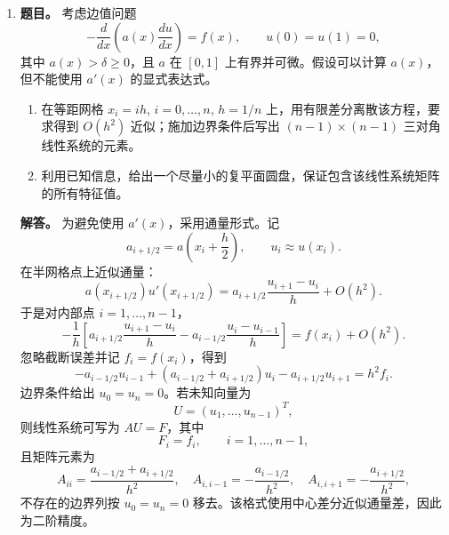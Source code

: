﻿\documentclass[UTF8,12pt]{ctexart}
\begin{document}
\begin{enumerate}[label=\textbf{\arabic*.},leftmargin=2.2em]
\textbf{解答。} 由 \(x=\cos\theta\)，
\[
T_{n+1}'(x)
=\frac{d}{dx}\cos((n+1)\theta)
=\frac{-(n+1)\sin((n+1)\theta)}{-\sin\theta},
\]
所以
\[
U_n(\cos\theta)=\frac{\sin((n+1)\theta)}{\sin\theta}.
\]
利用三角恒等式
\[
\sin((n+2)\theta)=2\cos\theta\,\sin((n+1)\theta)-\sin(n\theta),
\]
得到
\[
U_{n+1}(x)=2xU_n(x)-U_{n-1}(x),
\qquad U_0(x)=1,\quad U_1(x)=2x.
\]

再令 \(x=\cos\theta\)。当 \(x\) 从 \(-1\) 到 \(1\) 时，\(\theta\) 从 \(\pi\) 到 \(0\)，并且
\[
dx=-\sin\theta\,d\theta,\qquad \sqrt{1-x^2}=\sin\theta.
\]
因此
\[
\begin{aligned}
\int_{-1}^1U_m(x)U_n(x)\sqrt{1-x^2}\,dx
&=\int_0^\pi
\frac{\sin((m+1)\theta)}{\sin\theta}
\frac{\sin((n+1)\theta)}{\sin\theta}
\sin^2\theta\,d\theta\\
&=\int_0^\pi \sin((m+1)\theta)\sin((n+1)\theta)\,d\theta.
\end{aligned}
\]
最后一个积分在 \(m\ne n\) 时为 \(0\)，在 \(m=n\) 时为 \(\pi/2\)，故正交性成立。

二点 Gauss 求积的节点是二次正交多项式 \(U_2\) 的零点。由递推式
\[
U_2(x)=2xU_1(x)-U_0(x)=4x^2-1,
\]
可得
\[
x_1=-\frac12,\qquad x_2=\frac12.
\]
权函数为偶函数，节点关于 \(0\) 对称，所以 \(w_1=w_2\)。由常数函数精确性，
\[
w_1+w_2=\int_{-1}^1\sqrt{1-x^2}\,dx=\frac{\pi}{2}.
\]
因此
\[
w_1=w_2=\frac{\pi}{4},
\]
二点公式为
\[
\int_{-1}^1 f(x)\sqrt{1-x^2}\,dx
\approx
\frac{\pi}{4}f\!\left(-\frac12\right)
+\frac{\pi}{4}f\!\left(\frac12\right).
\]
该公式对次数不超过 \(3\) 的多项式精确。

\item \textbf{题目。} 考虑边值问题
\[
-\frac{d}{dx}\left(a(x)\frac{du}{dx}\right)=f(x),
\qquad u(0)=u(1)=0,
\]
其中 \(a(x)>\delta\ge0\)，且 \(a\) 在 \([0,1]\) 上有界并可微。假设可以计算 \(a(x)\)，但不能使用 \(a'(x)\) 的显式表达式。
\begin{enumerate}[label=(\alph*),leftmargin=2.0em]
\item 在等距网格 \(x_i=ih\), \(i=0,\ldots,n\), \(h=1/n\) 上，用有限差分离散该方程，要求得到 \(O(h^2)\) 近似；施加边界条件后写出 \((n-1)\times(n-1)\) 三对角线性系统的元素。
\item 利用已知信息，给出一个尽量小的复平面圆盘，保证包含该线性系统矩阵的所有特征值。
\end{enumerate}

\textbf{解答。} 为避免使用 \(a'(x)\)，采用通量形式。记
\[
a_{i+1/2}=a\left(x_i+\frac h2\right),\qquad u_i\approx u(x_i).
\]
在半网格点上近似通量：
\[
a(x_{i+1/2})u'(x_{i+1/2})
=a_{i+1/2}\frac{u_{i+1}-u_i}{h}+O(h^2).
\]
于是对内部点 \(i=1,\ldots,n-1\)，
\[
-\frac1h\left[
a_{i+1/2}\frac{u_{i+1}-u_i}{h}
-a_{i-1/2}\frac{u_i-u_{i-1}}{h}
\right]=f(x_i)+O(h^2).
\]
忽略截断误差并记 \(f_i=f(x_i)\)，得到
\[
-a_{i-1/2}u_{i-1}+(a_{i-1/2}+a_{i+1/2})u_i-a_{i+1/2}u_{i+1}
=h^2f_i.
\]
边界条件给出 \(u_0=u_n=0\)。若未知向量为
\[
U=(u_1,\ldots,u_{n-1})^T,
\]
则线性系统可写为 \(AU=F\)，其中
\[
F_i=f_i,\qquad i=1,\ldots,n-1,
\]
且矩阵元素为
\[
A_{ii}=\frac{a_{i-1/2}+a_{i+1/2}}{h^2},
\quad
A_{i,i-1}=-\frac{a_{i-1/2}}{h^2},
\quad
A_{i,i+1}=-\frac{a_{i+1/2}}{h^2},
\]
不存在的边界列按 \(u_0=u_n=0\) 移去。该格式使用中心差分近似通量差，因此为二阶精度。


\end{enumerate}
\end{document}
